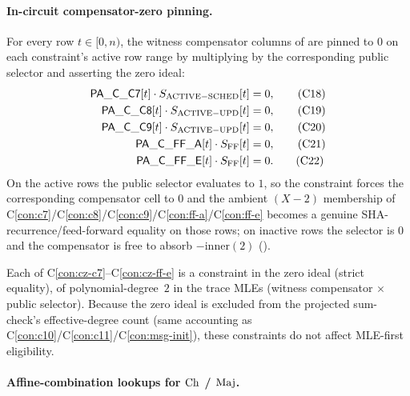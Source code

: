 \paragraph{In-circuit compensator-zero pinning.}

For every row $t \in [0, n)$, the witness compensator columns of
 are pinned to $0$ on each constraint's active
row range by multiplying by the corresponding public selector and
asserting the zero ideal:
\begin{align}
\mathsf{PA\_C\_C7}[t]    \cdot S_{\mathrm{ACTIVE-SCHED}}[t] &= 0, \tag{C18}\label{con:cz-c7}\\
\mathsf{PA\_C\_C8}[t]    \cdot S_{\mathrm{ACTIVE-UPD}}[t]   &= 0, \tag{C19}\label{con:cz-c8}\\
\mathsf{PA\_C\_C9}[t]    \cdot S_{\mathrm{ACTIVE-UPD}}[t]   &= 0, \tag{C20}\label{con:cz-c9}\\
\mathsf{PA\_C\_FF\_A}[t] \cdot S_{\mathrm{FF}}[t]           &= 0, \tag{C21}\label{con:cz-ff-a}\\
\mathsf{PA\_C\_FF\_E}[t] \cdot S_{\mathrm{FF}}[t]           &= 0. \tag{C22}\label{con:cz-ff-e}
\end{align}
On the active rows the public selector evaluates to $1$, so the
constraint forces the corresponding compensator cell to $0$ and the
ambient $(X-2)$ membership of C\ref{con:c7}/C\ref{con:c8}/C\ref{con:c9}/C\ref{con:ff-a}/C\ref{con:ff-e}
becomes a genuine SHA-recurrence/feed-forward equality on those
rows; on inactive rows the selector is $0$ and the compensator is
free to absorb $-\mathrm{inner}(2)$ ().

Each of C\ref{con:cz-c7}--C\ref{con:cz-ff-e} is a constraint in the
zero ideal (strict equality), of polynomial-degree~$2$ in the trace
MLEs (witness compensator $\times$ public selector). Because the
zero ideal is excluded from the projected sum-check's
effective-degree count (same accounting as C\ref{con:c10}/C\ref{con:c11}/C\ref{con:msg-init}),
these constraints do not affect MLE-first eligibility.

\paragraph{Affine-combination lookups for $\operatorname{Ch}$ / $\operatorname{Maj}$.}

